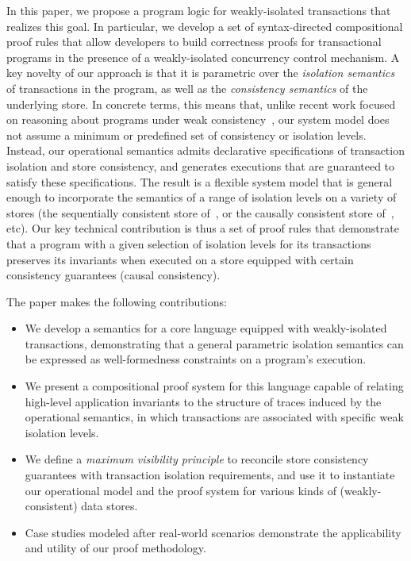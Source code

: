 In this paper, we propose a program logic for weakly-isolated
transactions that realizes this goal.  In particular, we develop a set
of syntax-directed compositional proof rules that allow developers to
build correctness proofs for transactional programs in the presence of
a weakly-isolated concurrency control mechanism.  A key novelty of our
approach is that it is parametric over the \emph{isolation semantics}
of transactions in the program, as well as the \emph{consistency
semantics} of the underlying store. In concrete terms, this means
that, unlike recent work focused on reasoning about programs under
weak consistency~\cite{gotsmanpopl16, redblueatc, ecinec}, our system
model does not assume a minimum or predefined set of consistency or
isolation levels. Instead, our operational semantics admits
declarative specifications of transaction isolation and store
consistency, and generates executions that are guaranteed to satisfy
these specifications. The result is a flexible system model that is
general enough to incorporate the semantics of a range of isolation
levels on a variety of stores (\eg the sequentially consistent store
of~\cite{adyaphd}, or the causally consistent store
of~\cite{gotsmanpopl16}, etc).  Our key technical contribution is thus
a set of proof rules that demonstrate that a program with a given
selection of isolation levels for its transactions preserves its
invariants when executed on a store equipped with certain consistency
guarantees (\eg causal consistency).

The paper makes the following contributions:

\begin{itemize}
  \item We develop a semantics for a core language equipped with
    weakly-isolated transactions, demonstrating that a general
    parametric isolation semantics can be expressed as
    well-formedness constraints on a program's execution.
  \item We present a compositional proof system for this language
    capable of relating high-level application invariants to the structure
    of traces induced by the operational semantics, in which transactions
    are associated with specific weak isolation levels.
  \item We define a \emph{maximum visibility principle} to reconcile
    store consistency guarantees with transaction isolation
    requirements, and use it to instantiate our operational model and
    the proof system for various kinds of (weakly-consistent) data
    stores.
  \item Case studies modeled after real-world scenarios demonstrate
    the applicability and utility of our proof methodology.
\end{itemize}

